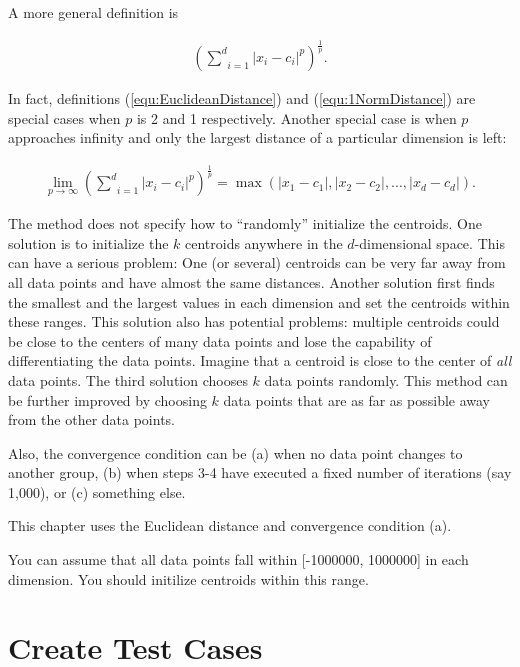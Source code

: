 A more general definition is

\begin{gather}
  (\underset{i=1}{\overset{d}{\sum}} |x_i - c_i| ^ p) ^ {\frac{1}{p}}.
\end{gather}

In fact, definitions (\ref{equ:EuclideanDistance}) and
(\ref{equ:1NormDistance}) are special cases when $p$ is 2 and 1
respectively.  Another special case is when $p$ approaches
infinity and only  the largest distance of a particular
dimension is left:

\begin{gather}
  \underset{p \rightarrow \infty}{\lim}(\underset{i=1}{\overset{d}{\sum}} |x_i - c_i| ^ p) ^ {\frac{1}{p}}
  = \max(|x_1 - c_1|, |x_2 - c_2|, ..., |x_d - c_d|).
\end{gather}

The method does not specify how to ``randomly'' initialize the
centroids. One solution is to initialize the $k$ centroids anywhere in
the $d$-dimensional space.  This can have a serious problem: One (or
several) centroids can be very far away from all data points and have
almost the same distances.  Another solution first finds the smallest
and the largest values in each dimension and set the centroids within
these ranges.  This solution also has potential problems: multiple
centroids could be close to the centers of many data points and lose
the capability of differentiating the data points.  Imagine that a
centroid is close to the center of {\it all} data points.  The third
solution chooses $k$ data points randomly.  This method can be further
improved by choosing $k$ data points that are as far as possible away
from the other data points.






Also, the convergence condition can be (a) when no data
point changes to another group, (b) when steps 3-4 have executed a
fixed number of iterations (say 1,000), or (c) something else.

This chapter uses the Euclidean distance and convergence condition
(a).

You can assume that all data points fall within [-1000000, 1000000] in
   each dimension. You should initilize centroids within this range.

   
\section{Create Test Cases}

